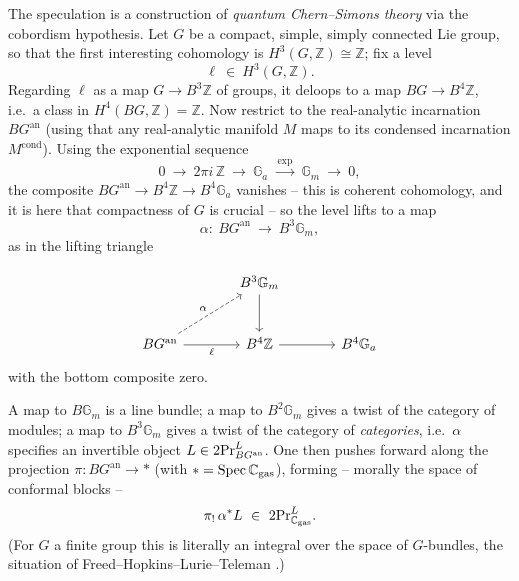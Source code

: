 The speculation is a construction of \emph{quantum Chern--Simons theory} via the
cobordism hypothesis. Let $G$ be a compact, simple, simply connected Lie group,
so that the first interesting cohomology is $H^3(G,\mathbb Z)\cong\mathbb Z$; fix
a level
\begin{equation*}
\ell\ \in\ H^3(G,\mathbb Z).
\end{equation*}
Regarding $\ell$ as a map $G\to B^3\mathbb Z$ of groups, it deloops to a map
$BG\to B^4\mathbb Z$, i.e.\ a class in $H^4(BG,\mathbb Z)=\mathbb Z$. Now restrict
to the real-analytic incarnation $BG^{\mathrm{an}}$ (using that any real-analytic
manifold $M$ maps to its condensed incarnation $M^{\mathrm{cond}}$). Using the
exponential sequence
\begin{equation}
\label{eq:24:exponential}
0\ \longrightarrow\ 2\pi i\,\mathbb Z\ \longrightarrow\ \mathbb G_a\
\xrightarrow{\ \exp\ }\ \mathbb G_m\ \longrightarrow\ 0 ,
\end{equation}
the composite $BG^{\mathrm{an}}\to B^4\mathbb Z\to B^4\mathbb G_a$ vanishes --
this is coherent cohomology, and it is here that compactness of $G$ is crucial
-- so the level lifts to a map
\begin{equation*}
\alpha\colon\ BG^{\mathrm{an}}\ \longrightarrow\ B^3\mathbb G_m ,
\end{equation*}
as in the lifting triangle

\begin{equation*}
\begin{tikzcd}[column sep=large, row sep=large]
& B^3\mathbb G_m \arrow[d] \\
BG^{\mathrm{an}} \arrow[ur, "\alpha", dashed]
  \arrow[r, "\ell"'] & B^4\mathbb Z \arrow[r] & B^4\mathbb G_a
\end{tikzcd}
\end{equation*}
with the bottom composite zero.

A map to $B\mathbb G_m$ is a line bundle; a map to $B^2\mathbb G_m$ gives a twist
of the category of modules; a map to $B^3\mathbb G_m$ gives a twist of the
category of \emph{categories}, i.e.\ $\alpha$ specifies an invertible object
$L\in 2\mathrm{Pr}^{L}_{BG^{\mathrm{an}}}$. One then pushes forward along the projection
$\pi\colon BG^{\mathrm{an}}\to\ast$ (with $\ast=\operatorname{Spec}\mathbb C_{\mathrm{gas}}$), forming
-- morally the space of conformal blocks --
\begin{equation}
\label{eq:24:conformal-blocks}
\pi_!\,\alpha^*L\ \in\ 2\mathrm{Pr}^{L}_{\mathbb C_{\mathrm{gas}}} .
\end{equation}
(For $G$ a finite group this is literally an integral over the space of
$G$-bundles, the situation of Freed--Hopkins--Lurie--Teleman
\cite{freed2009topologicalquantumfieldtheories}.)

